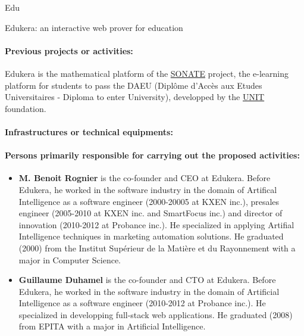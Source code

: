 \begin{sitedescription}{Edu}
\begin{compactitem}
    \item Edukera: an interactive web prover for education
\end{compactitem}

\paragraph{Previous projects or activities:}


\begin{compactitem}
\item Edukera is the mathematical platform of the \hyperlink{https://daeu-sonate.fr/}{SONATE} project, the e-learning platform for
students to pass the DAEU (Diplôme d'Accès aux Etudes Universitaires - Diploma to enter University), developped by the \hyperlink{http://www.unit.eu/}{UNIT} foundation.
\end{compactitem}

\paragraph{Infrastructures or technical equipments:}


\paragraph{Persons primarily responsible for carrying out the proposed activities:}

\begin{itemize} %
\item{\bf M. Benoit Rognier} is the co-founder and CEO at Edukera.
Before Edukera, he worked in the software industry in the domain of Artifical Intelligence
as a software engineer (2000-20005 at KXEN inc.), presales engineer (2005-2010 at KXEN inc.
and SmartFocus inc.) and director of innovation (2010-2012 at Probance inc.).
He specialized in applying Artifial Intelligence techniques in marketing automation solutions.
He graduated (2000) from the Institut Supérieur de la Matière et du Rayonnement
with a major in Computer Science.

\item{\bf Guillaume Duhamel} is the co-founder and CTO at Edukera.
Before Edukera, he worked in the software industry in the domain of Artificial Intelligence
as a software engineer (2010-2012 at Probance inc.). He specialized in developping full-stack web applications.
He graduated (2008) from EPITA with a major in Artificial Intelligence.

\end{itemize}

\end{sitedescription}

